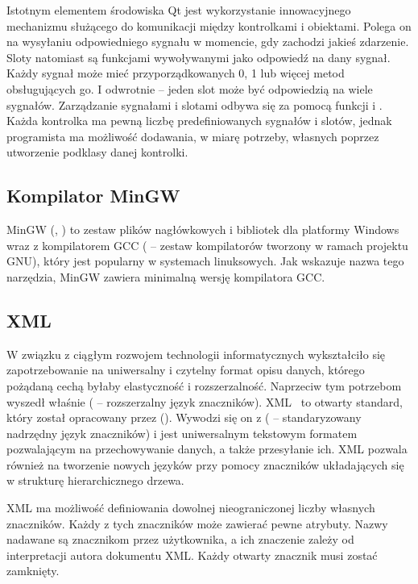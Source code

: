 Istotnym elementem środowiska Qt jest wykorzystanie innowacyjnego mechanizmu służącego do komunikacji między kontrolkami i obiektami.
Polega on na wysyłaniu odpowiedniego sygnału w momencie, gdy zachodzi jakieś zdarzenie. Sloty natomiast są funkcjami wywoływanymi jako 
odpowiedź na dany sygnał. Każdy sygnał może mieć przyporządkowanych 0, 1 lub więcej metod obsługujących go. I odwrotnie -- jeden slot 
może być odpowiedzią na wiele sygnałów. Zarządzanie sygnałami i slotami odbywa się za pomocą funkcji  i .
Każda kontrolka ma pewną liczbę predefiniowanych sygnałów i slotów, jednak programista ma możliwość dodawania, w miarę potrzeby, własnych 
poprzez utworzenie podklasy danej kontrolki.

\subsection{Kompilator MinGW}\label{mingw}

MinGW (, \cite{mingw}) to zestaw plików nagłówkowych i bibliotek dla platformy Windows wraz z kompilatorem 
GCC ( -- zestaw kompilatorów tworzony w ramach projektu GNU), który jest popularny w systemach linuksowych. Jak wskazuje 
nazwa tego narzędzia, MinGW zawiera minimalną wersję kompilatora GCC.

\subsection{XML}

W związku z ciągłym rozwojem technologii informatycznych wykształciło się zapotrzebowanie na uniwersalny i czytelny format opisu danych, 
którego pożądaną cechą byłaby elastyczność i rozszerzalność. Naprzeciw tym potrzebom wyszedł właśnie  ( -- 
rozszerzalny język znaczników). XML~\cite{xml} to otwarty standard, który został opracowany przez  
(). Wywodzi się on z  ( 
-- standaryzowany nadrzędny język znaczników) i jest uniwersalnym tekstowym formatem pozwalającym na przechowywanie danych, a także 
przesyłanie ich. XML pozwala również na tworzenie nowych języków przy pomocy znaczników układających się w strukturę hierarchicznego drzewa.

XML ma możliwość definiowania dowolnej nieograniczonej liczby własnych znaczników. Każdy z tych znaczników może zawierać pewne atrybuty. 
Nazwy nadawane są znacznikom przez użytkownika, a ich znaczenie zależy od interpretacji autora dokumentu XML. Każdy otwarty znacznik musi 
zostać zamknięty.

